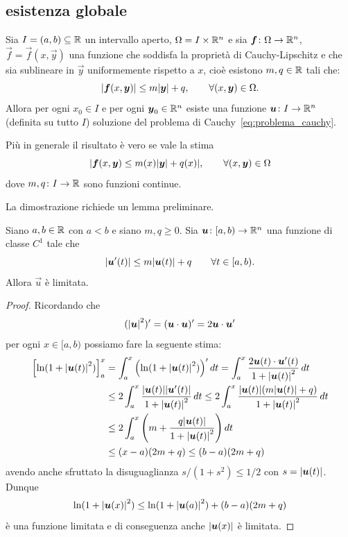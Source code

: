 \subsection{esistenza globale}

\begin{theorem}
\label{th:edo_esistenza_globale}
Sia $I = (a,b) \subseteq {\mathbb R}$ un intervallo aperto, $\Omega=I\times {\mathbb R}^n$ e sia
$\boldsymbol f\colon \Omega \to {\mathbb R}^n$, $\vec f = \vec f(x,\vec y)$ una funzione che
soddisfa la proprietà di Cauchy-Lipschitz
e che sia sublineare in $\vec y$ uniformemente rispetto a $x$, cioè
esistono $m,q\in {\mathbb R}$ tali che:
\[
  {\left|\boldsymbol f(x,\boldsymbol y)\right|} \le m{\left|\boldsymbol y\right|} + q,
  \qquad\forall (x,\boldsymbol y)\in \Omega.
\]
Allora per ogni $x_0\in I$ e per ogni $\boldsymbol y_0\in {\mathbb R}^n$ esiste una funzione
$\boldsymbol u\colon I \to {\mathbb R}^n$ (definita su tutto $I$) soluzione del problema di Cauchy~\eqref{eq:problema_cauchy}.

Più in generale il risultato è vero se vale la stima 
\[
   {\left|\boldsymbol f(x,\boldsymbol y) \le m(x){\left|\boldsymbol y\right|} + q(x)\right|},
   \qquad\forall (x,\boldsymbol y) \in \Omega
\]
dove $m,q\colon I\to{\mathbb R}$ sono funzioni continue.
\end{theorem}
%
La dimostrazione richiede un lemma preliminare.
\begin{lemma}[Gronwall]
Siano $a,b\in {\mathbb R}$ con $a<b$ e siano $m,q\ge 0$.
Sia $\boldsymbol u \colon [a,b) \to {\mathbb R}^n$ una funzione di classe $C^1$
tale che
\[
  {\left|\boldsymbol u'(t)\right|} \le m {\left|\boldsymbol u(t)\right|} + q
  \qquad \forall t\in [a,b).
\]
Allora $\vec u$ è limitata.
\end{lemma}
%
\begin{proof}
Ricordando che
\[
  ({\left|\boldsymbol u\right|}^2)'
  = (\boldsymbol u\cdot \boldsymbol u)'
  = 2 \boldsymbol u \cdot \boldsymbol u'
\]
per ogni $x\in [a,b)$ possiamo fare la seguente stima:
\begin{align*}
{\left[ \ln(1+{\left|\boldsymbol u(t)\right|}^2) \right]}_{a}^{x}
&= \int_{a}^{x}
  {\left( \ln(1+{\left|\boldsymbol u(t)\right|}^2) \right)}' \, dt
= \int_{a}^{x}
\frac{2\boldsymbol u(t)\cdot \boldsymbol u'(t)}{1+{\left|\boldsymbol u(t)\right|}^2}\, dt \\
&\le 2 \int_{a}^{x} \frac{{\left|\boldsymbol u(t)\right|} {\left|\boldsymbol u'(t)\right|}}{1+{\left|\boldsymbol u(t)\right|}^2}\, dt
\le 2\int_{a}^{x} \frac{{\left|\boldsymbol u(t)\right|}{\left( m{\left|\boldsymbol u(t)\right|}+q \right)}}{1+{\left|\boldsymbol u(t)\right|}^2}\, dt\\
&\le 2\int_{a}^{x} {\left( m + \frac{q{\left|\boldsymbol u(t)\right|}}{1+{\left|\boldsymbol u(t)\right|}^2} \right)}\, dt\\
&\le (x-a)(2m + q) \le (b-a)(2m+q)
\end{align*}
avendo anche sfruttato la disuguaglianza $s/(1+s^2) \le 1/2$ con $s={\left|\boldsymbol u(t)\right|}$.
Dunque
\[
  \ln(1+{\left|\boldsymbol u(x)\right|}^2) \le \ln(1+{\left|\boldsymbol u(a)\right|}^2) + (b-a)(2m+q)
\]
è una funzione limitata e di conseguenza anche ${\left|\boldsymbol u(x)\right|}$ è limitata.
\end{proof}


